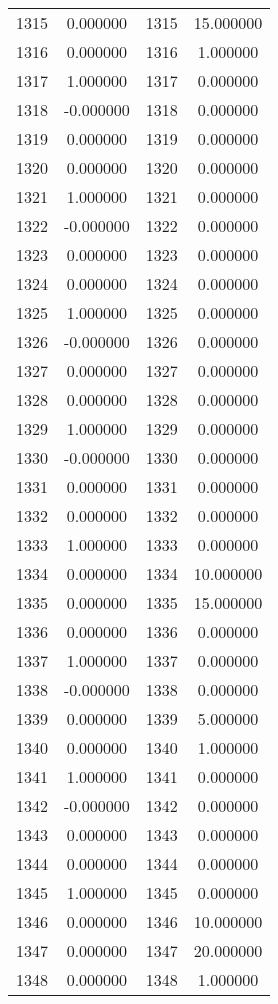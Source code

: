 \documentclass[12pt]{article}
\begin{document}
\begin{longtable}{@{}cccc@{}}
1315 & 0.000000 & 1315 & 15.000000 \\
1316 & 0.000000 & 1316 & 1.000000 \\
1317 & 1.000000 & 1317 & 0.000000 \\
1318 & -0.000000 & 1318 & 0.000000 \\
1319 & 0.000000 & 1319 & 0.000000 \\
1320 & 0.000000 & 1320 & 0.000000 \\
1321 & 1.000000 & 1321 & 0.000000 \\
1322 & -0.000000 & 1322 & 0.000000 \\
1323 & 0.000000 & 1323 & 0.000000 \\
1324 & 0.000000 & 1324 & 0.000000 \\
1325 & 1.000000 & 1325 & 0.000000 \\
1326 & -0.000000 & 1326 & 0.000000 \\
1327 & 0.000000 & 1327 & 0.000000 \\
1328 & 0.000000 & 1328 & 0.000000 \\
1329 & 1.000000 & 1329 & 0.000000 \\
1330 & -0.000000 & 1330 & 0.000000 \\
1331 & 0.000000 & 1331 & 0.000000 \\
1332 & 0.000000 & 1332 & 0.000000 \\
1333 & 1.000000 & 1333 & 0.000000 \\
1334 & 0.000000 & 1334 & 10.000000 \\
1335 & 0.000000 & 1335 & 15.000000 \\
1336 & 0.000000 & 1336 & 0.000000 \\
1337 & 1.000000 & 1337 & 0.000000 \\
1338 & -0.000000 & 1338 & 0.000000 \\
1339 & 0.000000 & 1339 & 5.000000 \\
1340 & 0.000000 & 1340 & 1.000000 \\
1341 & 1.000000 & 1341 & 0.000000 \\
1342 & -0.000000 & 1342 & 0.000000 \\
1343 & 0.000000 & 1343 & 0.000000 \\
1344 & 0.000000 & 1344 & 0.000000 \\
1345 & 1.000000 & 1345 & 0.000000 \\
1346 & 0.000000 & 1346 & 10.000000 \\
1347 & 0.000000 & 1347 & 20.000000 \\
1348 & 0.000000 & 1348 & 1.000000 \\

\end{longtable}
\end{document}
